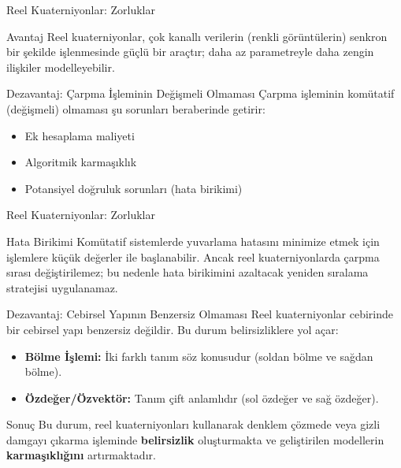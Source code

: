 \documentclass[aspectratio=169,xcolor={dvipsnames}]{beamer}
\begin{document}
\begin{frame}{Reel Kuaterniyonlar: Zorluklar}
    \begin{block}{Avantaj}
        Reel kuaterniyonlar, çok kanallı verilerin (renkli görüntülerin) senkron bir şekilde işlenmesinde güçlü bir araçtır; daha az parametreyle daha zengin ilişkiler modelleyebilir.
    \end{block}
    \begin{alertblock}{Dezavantaj: Çarpma İşleminin Değişmeli Olmaması}
        Çarpma işleminin komütatif (değişmeli) olmaması şu sorunları beraberinde getirir:
        \begin{itemize}
            \item Ek hesaplama maliyeti
            \item Algoritmik karmaşıklık
            \item Potansiyel doğruluk sorunları (hata birikimi)
        \end{itemize}
    \end{alertblock}

\end{frame}

\begin{frame}{Reel Kuaterniyonlar: Zorluklar}
    \begin{exampleblock}{Hata Birikimi}
        Komütatif sistemlerde yuvarlama hatasını minimize etmek için işlemlere küçük değerler ile başlanabilir. Ancak reel kuaterniyonlarda çarpma sırası değiştirilemez; bu nedenle hata birikimini azaltacak yeniden sıralama stratejisi uygulanamaz.
    \end{exampleblock}
    \begin{block}{Dezavantaj: Cebirsel Yapının Benzersiz Olmaması}
        Reel kuaterniyonlar cebirinde bir cebirsel yapı benzersiz değildir. Bu durum belirsizliklere yol açar:
        \begin{itemize}
            \item \textbf{Bölme İşlemi:} İki farklı tanım söz konusudur (soldan bölme ve sağdan bölme).

            \item \textbf{Özdeğer/Özvektör:} Tanım çift anlamlıdır (sol özdeğer ve sağ özdeğer).
        \end{itemize}
    \end{block}

    
    \begin{alertblock}{Sonuç}
        Bu durum, reel kuaterniyonları kullanarak denklem çözmede veya gizli damgayı çıkarma işleminde \textbf{belirsizlik} oluşturmakta ve geliştirilen modellerin \textbf{karmaşıklığını} artırmaktadır.
    \end{alertblock}
\end{frame}
\end{document}
